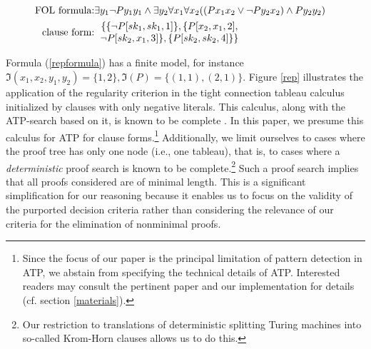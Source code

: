 \documentclass[%
  manuscript=article,   %
  year=2024,
  volume=77,
  doi=00000.000,
]{zfn}
\begin{document}
\begin{eqnarray}
\mbox{FOL formula:} & \exists y_{1} \neg Py_{1}y_{1} \wedge \exists y_{2}\forall x_{1}\forall x_{2}((Px_{1}x_{2} \vee \neg Py_{2}x_{2}) \wedge Py_{2}y_{2}) & \label{repformula}  \\
\mbox{clause form:} & \begin{tabular}{c}$\{\{\neg P[sk_1,sk_1,1]\},\{P[x_{2},x_{1},2],$\\
$\neg P[sk_2,x_{1},3]\}, \{P[sk_2,sk_2,4]\}\}$\end{tabular} & \label{repclause}
\end{eqnarray}

Formula (\ref{repformula}) has a finite model, for instance $\Im(x_1,x_2,y_1,y_2) = \{1,2\}, \Im(P) = \{(1,1),(2,1)\}$.
Figure \ref{rep} illustrates the application of the regularity criterion in the tight connection tableau calculus
initialized by clauses with only negative literals. \label{onenegative} This calculus, along with the ATP-search based on it, is known to be complete  \parencite[cf.][]{LetzStenz}. In this paper, we presume this calculus for ATP for clause forms.\footnote{Since the focus of our paper is the principal limitation of pattern detection in ATP, we abstain from specifying the technical details of ATP. Interested readers may consult the  pertinent paper \parencite{LetzStenz} and our implementation for details (cf. section \ref{materials}).} Additionally, we limit ourselves to cases where the proof tree has only one node (i.e., one tableau), that is, to cases where a \emph{deterministic} proof search is known to be complete.\footnote{Our restriction to translations of deterministic splitting Turing machines into so-called Krom-Horn clauses allows us to do this.} Such a proof search implies that all proofs considered are of minimal length. This is a significant simplification for our reasoning because it enables us to focus on the validity of the purported decision criteria rather than considering the relevance of our criteria for the elimination of nonminimal proofs.
\end{document}
